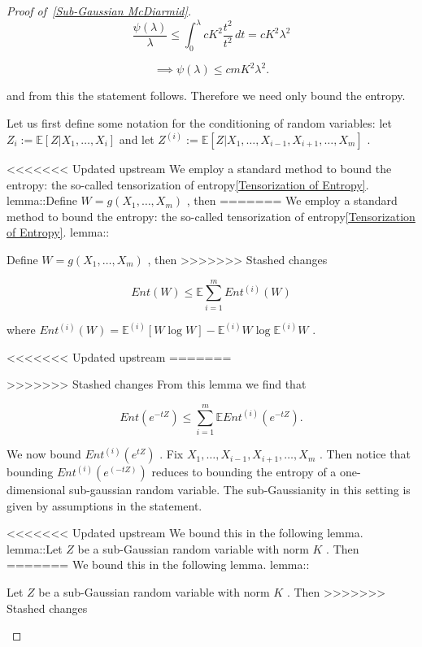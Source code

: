 \documentclass{article}
\begin{document}
\begin{proof}[Proof of~{\autoref{Sub-Gaussian McDiarmid}}]
\begin{equation*}
\frac{\psi(\lambda)}{\lambda} \leq \int _0^\lambda cK^2 \frac{t^2}{t^2} \, dt = cK^2 \lambda^2
\end{equation*}


\begin{equation*}
\implies \psi(\lambda) \leq cmK^2 \lambda^2.
\end{equation*}

and from this the statement follows. Therefore we need only bound the entropy.

Let us first define some notation for the conditioning of random variables: let  $Z_i := \mathbb{E}[Z |X_1, \dots, X_i]$  and let  $Z^{(i)}:= \mathbb{E}[Z|X_1, \dots, X_{i-1}, X_{i+1}, \dots, X_m]$ .

<<<<<<< Updated upstream
We employ a standard method to bound the entropy: the so-called tensorization of entropy\ref{Tensorization of Entropy}. lemma::Define  $W = g(X_1, \dots, X_m)$ , then
=======
We employ a standard method to bound the entropy: the so-called tensorization of entropy\ref{Tensorization of Entropy}. lemma::
\begin{lemma}
\label{Tensorization of Entropy}
Define  $W = g(X_1, \dots, X_m)$ , then
>>>>>>> Stashed changes


\begin{equation*}
Ent(W) \leq \mathbb{E} \sum_{i=1}^m Ent^{(i)}(W)
\end{equation*}

where  $Ent^{(i)}(W) = \mathbb{E}^{(i)}[W \log W] - \mathbb{E}^{(i)}W \log \mathbb{E}^{(i)}W$ .

<<<<<<< Updated upstream
=======

\end{lemma}
>>>>>>> Stashed changes
 From this lemma we find that


\begin{equation*}
Ent(e^{-tZ}) \leq \sum_{i=1}^m \mathbb{E} Ent^{(i)}(e^{-tZ}).
\end{equation*}

We now bound  $Ent^{(i)}(e^{tZ})$ . Fix  $X_1, \dots, X_{i-1}, X_{i+1},\dots, X_m$ . Then notice that bounding  $Ent^{(i)}(e^{(-tZ)})$  reduces to bounding the entropy of a one-dimensional sub-gaussian random variable. The sub-Gaussianity in this setting is given by assumptions in the statement.

<<<<<<< Updated upstream
We bound this in the following lemma. lemma::Let  $Z$  be a sub-Gaussian random variable with norm  $K$ . Then
=======
We bound this in the following lemma. lemma::
\begin{lemma}
\label{Bounding the Entropy of a Sub-Gaussian Random Variable}
Let  $Z$  be a sub-Gaussian random variable with norm  $K$ . Then
>>>>>>> Stashed changes



\end{lemma}
\end{proof}
\end{document}
